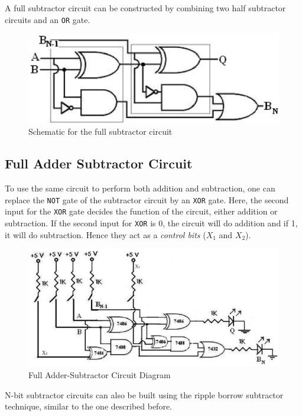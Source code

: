 A full subtractor circuit can be constructed by combining two half subtractor circuits and an \verb|OR| gate.

\begin{figure}[H]
    \centering
    \includegraphics[width=0.7\columnwidth]{images/full-sub.png}
    \caption{Schematic for the full subtractor circuit}
    \label{full-sub}
\end{figure}

\subsection*{Full Adder Subtractor Circuit}
To use the same circuit to perform both addition and subtraction, one can replace the \verb|NOT| gate of the subtractor circuit by an \verb|XOR| gate. Here, the second input for the \verb|XOR| gate decides the function of the circuit, either addition or subtraction. If the second input for \verb|XOR| is 0, the circuit will do addition and if 1, it will do subtraction. Hence they act as a \textit{control bits} ($X_1$ and $X_2$).

\begin{figure}[H]
    \centering
    \includegraphics[width=1\columnwidth]{images/full-comb.png}
    \caption{Full Adder-Subtractor Circuit Diagram}
    \label{full-add-sub}
\end{figure}

N-bit subtractor circuits can also be built using the ripple borrow subtractor technique, similar to the one described before.
